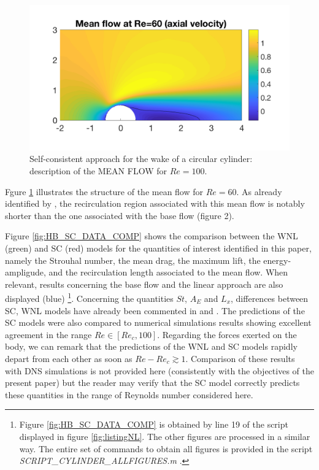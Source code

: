 \documentclass[twocolumn,10pt]{asme2ej}
\begin{document}
\begin{figure}
\begin{center}
\includegraphics[width=.9 \linewidth]{Cylinder_MeanFlowRe60.png}
\end{center}
\caption{Self-consistent approach for the wake of a circular cylinder:  description of the MEAN FLOW for  $Re = 
100$.}
\label{fig:MF60}
\end{figure}



Fgure \ref{fig:MF60} illustrates the structure of the mean flow for $Re=60$. As already identified by  \cite{MLugo2014}, the recirculation region associated with this mean flow is notably shorter than the one associated with the base flow (figure 2). 



 

Figure \ref{fig:HB_SC_DATA_COMP} shows the comparison between the WNL (green) and SC (red) models for the quantities of interest identified in this paper, namely the Strouhal number, the mean drag, the maximum lift, the energy-ampligude, and the recirculation length associated to the mean flow. When relevant, results concerning the base flow and the linear approach are also displayed (blue)
\footnote{Figure   \ref{fig:HB_SC_DATA_COMP} is obtained by line 19 of the script displayed in figure \ref{fig:listingNL}. The other figures are processed in a similar way. The entire set of commands to obtain all figures is provided in the script {\em SCRIPT\_CYLINDER\_ALLFIGURES.m} .}.
Concerning the quantities $St$, $A_E$ and $L_x$, differences between SC, WNL models have already been commented in  \cite{MLugo2014} and \cite{FDR2016}. The predictions of the SC models were also compared to numerical simulations results showing excellent agreement in the range $Re \in [Re_c,100]$. Regarding the forces exerted on the body, we can remark that the predictions of the WNL and SC models rapidly depart from each other as soon as $Re-Re_c \gtrsim 1$. Comparison of these results with DNS simulations is not provided here (consistently with the objectives of the present paper) but the reader may verify that the SC model correctly predicts these quantities in the range of Reynolds number considered here.
\end{document}
